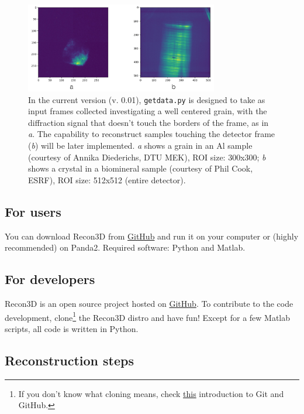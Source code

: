 \documentclass[11pt]{scrartcl}
\begin{document}
\begin{figure}[h]
    \centering
    \includegraphics[width=0.75\textwidth]{centered_not_centered}
    \caption{In the current version (v. 0.01), {\texttt{getdata.py}} is designed to take as input frames collected investigating a well centered grain, with the diffraction signal that doesn't touch the borders of the frame, as in {\emph{a}}. The capability to reconstruct samples touching the detector frame ({\emph{b}}) will be later implemented. {\emph{a}} shows a grain in an Al sample (courtesy of Annika Diederichs, {\footnotesize{DTU MEK}}), {\footnotesize{ROI}} size: 300x300; {\emph{b}} shows a crystal in a biomineral sample (courtesy of Phil Cook, {\footnotesize{ESRF}}), {\footnotesize{ROI}} size: 512x512 (entire detector).}
    \label{fig:centered_not_centered}
\end{figure}

\subsection{For users}

You can download Recon3D from  \href{https://github.com/albusdemens/Recon3D}{GitHub} and run it on your computer or (highly recommended) on Panda2. Required software: Python and Matlab. 

\subsection{For developers}

Recon3D is an open source project hosted on \href{https://github.com/albusdemens/Recon3D}{GitHub}. To contribute to the code development, clone\footnote{If you don't know what cloning means, check \href{http://product.hubspot.com/blog/git-and-github-tutorial-for-beginners}{this} introduction to Git and GitHub.} the Recon3D distro and have fun! Except for a few Matlab scripts, all code is written in Python. 

\subsection{Reconstruction steps}
\end{document}
